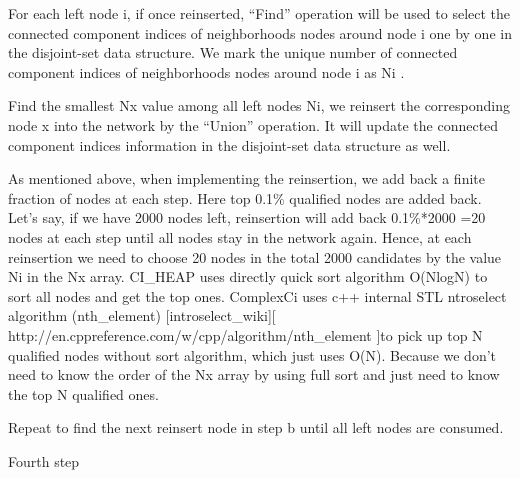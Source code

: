 \documentclass{article}
\begin{document}
\begin{enumerate}
\begin{item}
\begin{algorithm}
\begin{algorithmic}[1]
			\begin{enumerate}
			\begin{item}
				For each left node i, if once reinserted, “Find” operation will be used to select  the connected component indices of neighborhoods nodes around node i one by one in the disjoint-set data structure. We mark the unique number of connected component indices of neighborhoods nodes around node i as Ni .
			\end{item}		
			\begin{item}
				Find the smallest Nx value among all left nodes Ni, we reinsert the corresponding node x into the network by the “Union” operation. It will update the connected component indices information in the disjoint-set data structure as well.
			\end{item}	
			\begin{item}
				As mentioned above, when implementing the reinsertion, we add back a finite fraction of nodes at each step. Here top 0.1\% qualified nodes are added back. Let’s say, if we have 2000 nodes left, reinsertion will add back 0.1\%*2000 =20 nodes  at each step until all nodes stay in the network again. Hence, at each reinsertion we need to choose 20 nodes in the total 2000 candidates by the value Ni in the Nx array. CI\_HEAP uses directly quick sort algorithm O(NlogN) to sort all nodes and get the top ones. ComplexCi uses c++ internal STL ntroselect algorithm (nth\_element) [introselect\_wiki][ http://en.cppreference.com/w/cpp/algorithm/nth\_element ]to pick up top N qualified nodes without sort algorithm, which just uses O(N). Because we don’t need to know the order of the Nx array by using full sort and just need to know the top N qualified ones.
			\end{item}	
			
			\begin{item}
				Repeat to find the next reinsert node in step b until all left nodes are consumed.
			\end{item}	
			
		\end{enumerate}
		
		\STATE Fourth step \label{alg:last-step}
	\end{algorithmic}
\end{algorithm}




\end{item}
\end{enumerate}
\end{document}

